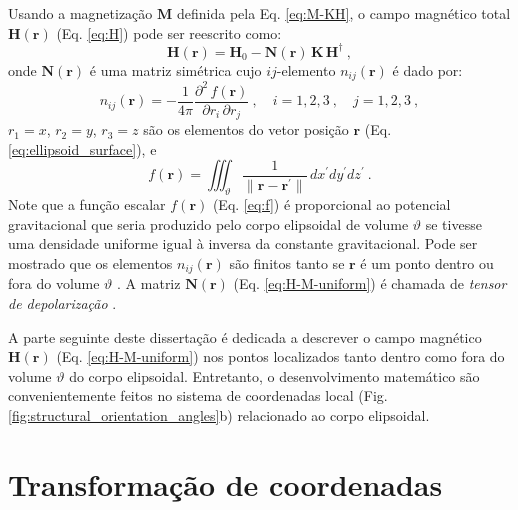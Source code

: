Usando a magnetização $\mathbf{M}$ definida pela Eq. \ref{eq:M-KH}, o campo magnético total $\mathbf{H}(\mathbf{r})$ (Eq. \ref{eq:H}) pode ser reescrito como:
\begin{equation}
\mathbf{H}(\mathbf{r}) = \mathbf{H}_{0} 
- \mathbf{N}(\mathbf{r}) \, \mathbf{K} \, \mathbf{H}^{\dagger} \: ,
\label{eq:H-M-uniform}
\end{equation}
onde $\mathbf{N}(\mathbf{r})$ é uma matriz simétrica cujo
$ij$-elemento $n_{ij}(\mathbf{r})$ é dado por:
\begin{equation}
n_{ij}(\mathbf{r}) = - 
\frac{1}{4\pi} \frac{\partial^{2} \, f(\mathbf{r})}
{\partial r_{i} \, \partial r_{j}} 
\: , \quad i = 1, 2, 3 \: , 
\quad j = 1, 2, 3 \: ,
\label{eq:nij}
\end{equation}
$r_{1} = x$, $r_{2} = y$, $r_{3} = z$ são os elementos do vetor posição $\mathbf{r}$ (Eq. \ref{eq:ellipsoid_surface}), 
e
\begin{equation}
f(\mathbf{r}) = \iiint_{\vartheta} 
\frac{1}{\| \mathbf{r} - \mathbf{r}^{\prime} \|}
\, dx^{\prime}dy^{\prime}dz^{\prime} \: .
\label{eq:f}
\end{equation}
Note que a função escalar $f(\mathbf{r})$ (Eq. \ref{eq:f}) é proporcional ao potencial gravitacional que seria produzido pelo corpo elipsoidal de volume $\vartheta$ se tivesse uma densidade uniforme igual à inversa da constante gravitacional. Pode ser mostrado que os elementos $n_{ij}(\mathbf{r})$ são finitos tanto se $\mathbf{r}$ é um ponto dentro ou fora do volume $\vartheta$ \citep{peirce1902, webster1904}. A matriz $\mathbf{N}(\mathbf{r})$ (Eq. \ref{eq:H-M-uniform}) é chamada de \textit{tensor de depolarização} \citep{soliverez1981, soliverez2008}.

A parte seguinte deste dissertação é dedicada a descrever o campo magnético $\mathbf{H}(\mathbf{r})$ (Eq. \ref{eq:H-M-uniform}) nos pontos localizados tanto dentro como fora do volume $\vartheta$ do corpo elipsoidal. Entretanto, o desenvolvimento matemático são convenientemente feitos no sistema de coordenadas local (Fig. \ref{fig:structural_orientation_angles}b) relacionado ao corpo elipsoidal.

\section{Transformação de coordenadas}

